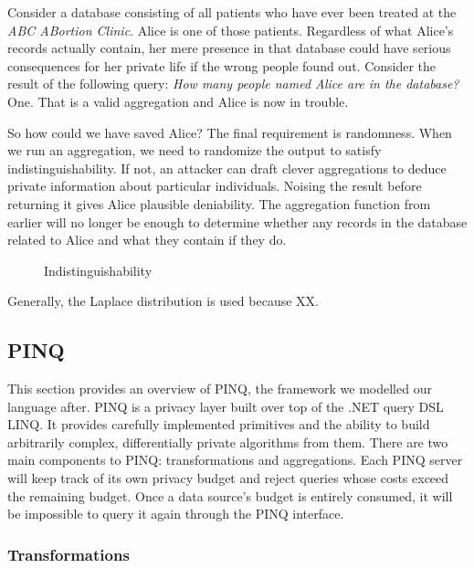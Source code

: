 \documentclass[12pt]{article}
\begin{document}
Consider a database consisting of all patients who have ever been treated at the \textit{ABC ABortion Clinic}.
Alice is one of those patients.
Regardless of what Alice's records actually contain, her mere presence in that database could have serious consequences for her private life if the wrong people found out.
Consider the result of the following query: \textit{How many people named Alice are in the database?}
One.
That is a valid aggregation and Alice is now in trouble.

So how could we have saved Alice?
The final requirement is randomness.
When we run an aggregation, we need to randomize the output to satisfy indistinguishability.
If not, an attacker can draft clever aggregations to deduce private information about particular individuals.
Noising the result before returning it gives Alice plausible deniability.
The aggregation function from earlier will no longer be enough to determine whether any records in the database related to Alice and what they contain if they do.

\begin{figure}
    \centering
    \def\svgwidth{\columnwidth}
    
    \caption{Indistinguishability}
\end{figure}

Generally, the Laplace distribution is used because XX.

\subsection{PINQ}\label{sec:pinq}

This section provides an overview of PINQ, the framework we modelled our language after.
PINQ is a privacy layer built over top of the .NET query DSL LINQ.
It provides carefully implemented primitives and the ability to build arbitrarily complex, differentially private algorithms from them.
There are two main components to PINQ: transformations and aggregations.
Each PINQ server will keep track of its own privacy budget and reject queries whose costs exceed the remaining budget.
Once a data source's budget is entirely consumed, it will be impossible to query it again through the PINQ interface.

\subsubsection{Transformations}
\end{document}
